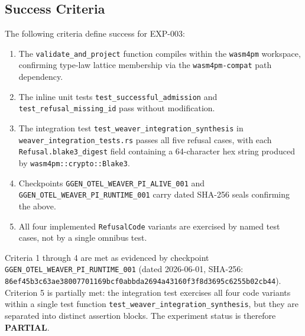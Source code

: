 \subsection{Success Criteria}
\label{sec:otel-weaver-exp-003-live-check-to-refusal-question-success}

The following criteria define success for EXP-003:

\begin{enumerate}
  \item The \texttt{validate\_and\_project} function compiles within the
        \texttt{wasm4pm} workspace, confirming type-law lattice membership via the
        \texttt{wasm4pm-compat} path dependency.
  \item The inline unit tests \texttt{test\_successful\_admission} and
        \texttt{test\_refusal\_missing\_id} pass without modification.
  \item The integration test \texttt{test\_weaver\_integration\_synthesis} in
        \texttt{weaver\_integration\_tests.rs} passes all five refusal cases, with
        each \texttt{Refusal.blake3\_digest} field containing a 64-character hex
        string produced by \texttt{wasm4pm::crypto::Blake3}.
  \item Checkpoints \texttt{GGEN\_OTEL\_WEAVER\_PI\_ALIVE\_001} and
        \texttt{GGEN\_OTEL\_WEAVER\_PI\_RUNTIME\_001} carry dated SHA-256 seals
        confirming the above.
  \item All four implemented \texttt{RefusalCode} variants are exercised by
        named test cases, not by a single omnibus test.
\end{enumerate}

Criteria 1 through 4 are met as evidenced by checkpoint
\texttt{GGEN\_OTEL\_WEAVER\_PI\_RUNTIME\_001} (dated 2026-06-01, SHA-256:
\texttt{86ef45b3c63ae38007701169bcf0abbda2694a43160f3f8d3695c6255b02cb44}).
Criterion 5 is partially met: the integration test exercises all four code variants
within a single test function \texttt{test\_weaver\_integration\_synthesis}, but they
are separated into distinct assertion blocks. The experiment status is therefore
\textbf{PARTIAL}.
